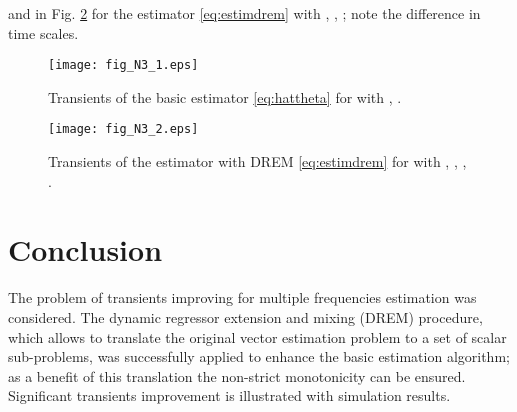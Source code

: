 \documentclass[journal, onecolumn]{IEEEtran}
\begin{document}
and in Fig. \ref{fig:N3_2} for the estimator \eqref{eq:estimdrem} with , , ; note the difference in time scales.

\begin{figure}[t]
	\centering
	\texttt{[image: fig\_N3\_1.eps]}
	\caption{Transients of the basic estimator \eqref{eq:hattheta} for  with , .}
	\label{fig:N3_1}
\end{figure}

\begin{figure}[t]
	\centering
	\texttt{[image: fig\_N3\_2.eps]}
	\caption{Transients of the estimator with DREM \eqref{eq:estimdrem} for  with , , , .}
	\label{fig:N3_2}
\end{figure}

\section{Conclusion}
The problem of transients improving for multiple frequencies estimation was considered. The dynamic regressor extension and mixing (DREM) procedure, which allows to translate the original vector estimation problem to a set of scalar sub-problems, was successfully applied to enhance the basic estimation algorithm;  as a benefit of this translation the non-strict monotonicity can be ensured. Significant transients improvement is illustrated with simulation results. 


             
\end{document}
